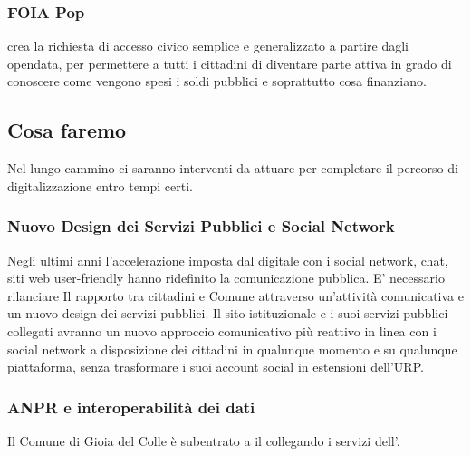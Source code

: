 \documentclass[a4paper,14pt,italian]{sphinxmanual}
\begin{document}
\subsubsection{FOIA Pop}
\label{\detokenize{digitale:foia-pop}}
 crea la richiesta di accesso civico semplice e generalizzato a partire dagli opendata, per permettere a tutti i cittadini di diventare parte attiva in grado di conoscere come vengono spesi i soldi pubblici e soprattutto cosa finanziano.


\subsection{Cosa faremo}
\label{\detokenize{digitale:cosa-faremo}}
Nel lungo cammino ci saranno interventi da attuare per completare il percorso di digitalizzazione entro tempi certi.


\subsubsection{Nuovo Design dei Servizi Pubblici e Social Network}
\label{\detokenize{digitale:nuovo-design-dei-servizi-pubblici-e-social-network}}
Negli ultimi anni l’accelerazione imposta dal digitale con i social network, chat, siti web user-friendly hanno ridefinito la comunicazione pubblica.
E’ necessario rilanciare Il rapporto tra cittadini e Comune attraverso un’attività comunicativa e un nuovo design dei servizi pubblici.
Il sito istituzionale e i suoi servizi pubblici collegati avranno un nuovo approccio comunicativo più reattivo in linea con i social network a disposizione dei cittadini in qualunque momento e su qualunque piattaforma, senza trasformare i suoi account social in estensioni dell’URP.


\subsubsection{ANPR e interoperabilità dei dati}
\label{\detokenize{digitale:anpr-e-interoperabilita-dei-dati}}
Il Comune di Gioia del Colle è subentrato a  il  collegando i servizi dell’.
\end{document}
